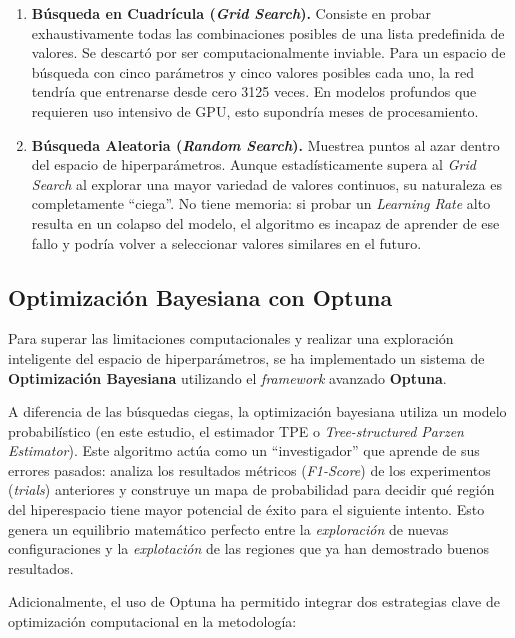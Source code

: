 \begin{enumerate}
	\item \textbf{Búsqueda en Cuadrícula (\textit{Grid Search}).} Consiste en probar exhaustivamente todas las combinaciones posibles de una lista predefinida de valores. Se descartó por ser computacionalmente inviable. Para un espacio de búsqueda con cinco parámetros y cinco valores posibles cada uno, la red tendría que entrenarse desde cero 3125 veces. En modelos profundos que requieren uso intensivo de GPU, esto supondría meses de procesamiento.
	
	\item \textbf{Búsqueda Aleatoria (\textit{Random Search}).} Muestrea puntos al azar dentro del espacio de hiperparámetros. Aunque estadísticamente supera al \textit{Grid Search} al explorar una mayor variedad de valores continuos, su naturaleza es completamente ``ciega''. No tiene memoria: si probar un \textit{Learning Rate} alto resulta en un colapso del modelo, el algoritmo es incapaz de aprender de ese fallo y podría volver a seleccionar valores similares en el futuro.
\end{enumerate}

\subsection{Optimización Bayesiana con Optuna}

Para superar las limitaciones computacionales y realizar una exploración inteligente del espacio de hiperparámetros, se ha implementado un sistema de \textbf{Optimización Bayesiana} utilizando el \textit{framework} avanzado \textbf{Optuna}.

A diferencia de las búsquedas ciegas, la optimización bayesiana utiliza un modelo probabilístico (en este estudio, el estimador TPE o \textit{Tree-structured Parzen Estimator}). Este algoritmo actúa como un ``investigador'' que aprende de sus errores pasados: analiza los resultados métricos (\textit{F1-Score}) de los experimentos (\textit{trials}) anteriores y construye un mapa de probabilidad para decidir qué región del hiperespacio tiene mayor potencial de éxito para el siguiente intento. Esto genera un equilibrio matemático perfecto entre la \textit{exploración} de nuevas configuraciones y la \textit{explotación} de las regiones que ya han demostrado buenos resultados.

Adicionalmente, el uso de Optuna ha permitido integrar dos estrategias clave de optimización computacional en la metodología:

